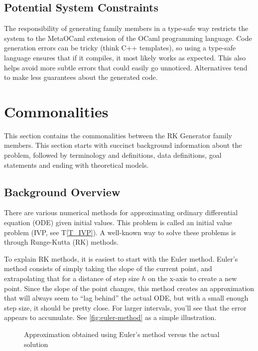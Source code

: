 \documentclass[12pt]{article}
\newcommand{\tref}[1]{T\ref{#1}}
\newcommand{\famname}{RK Generator} %
\begin{document}
                          
\subsection{Potential System Constraints}

The responsibility of generating family members in a type-safe way restricts 
the system to the MetaOCaml extension of the OCaml programming language.
Code generation errors can be tricky (think C++ templates), so using a 
type-safe language ensures that if it compiles, it most likely works as 
expected.
This also helps avoid more subtle errors that could easily go unnoticed.
Alternatives tend to make less guarantees about the generated code.
\section{Commonalities}

This section contains the commonalities between the \famname{} family members. 
This section starts with succinct background information about the problem, 
followed by terminology and definitions, data definitions, goal statements and 
ending with theoretical models. 

\subsection{Background Overview} \label{Sec_Background}

There are various numerical methods for approximating ordinary differential 
equation (ODE) given initial values. This problem is called an initial value 
problem (IVP, see \tref{T_IVP}). A well-known way to solve these problems is 
through Runge-Kutta (RK) methods.%

To explain RK methods, it is easiest to start with the Euler method. Euler's 
method consists of simply taking the slope of the current point, and 
extrapolating that for a distance of step size $h$ on the x-axis to create a 
new point. Since the slope of the point changes, this method creates an 
approximation that will always seem to ``lag behind'' the actual ODE, but with 
a small enough step size, it should be pretty close. For larger intervals, 
you'll see that the error appears to accumulate. See
\autoref{fig:euler-method} as a simple illustration.

\begin{figure}[htb]
  \centering
  \def\svgwidth{0.5\textwidth}
  
  \caption{Approximation obtained using Euler's method versus the actual 
  solution}
  \label{fig:euler-method}
\end{figure}
\end{document}
